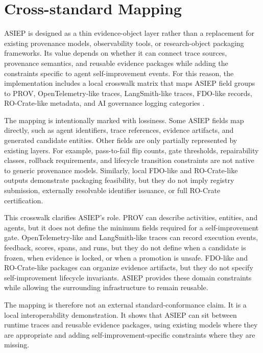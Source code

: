 \section{Cross-standard Mapping}

ASIEP is designed as a thin evidence-object layer rather than a replacement for existing provenance models, observability tools, or research-object packaging frameworks. Its value depends on whether it can connect trace sources, provenance semantics, and reusable evidence packages while adding the constraints specific to agent self-improvement events. For this reason, the implementation includes a local crosswalk matrix that maps ASIEP field groups to PROV, OpenTelemetry-like traces, LangSmith-like traces, FDO-like records, RO-Crate-like metadata, and AI governance logging categories \cite{w3c_prov_dm,otel_genai_semconv,langsmith_observability_concepts,fdo_architecture_spec,workflow_run_rocrate}.



The mapping is intentionally marked with lossiness. Some ASIEP fields map directly, such as agent identifiers, trace references, evidence artifacts, and generated candidate entities. Other fields are only partially represented by existing layers. For example, pass-to-fail flip counts, gate thresholds, repairability classes, rollback requirements, and lifecycle transition constraints are not native to generic provenance models. Similarly, local FDO-like and RO-Crate-like outputs demonstrate packaging feasibility, but they do not imply registry submission, externally resolvable identifier issuance, or full RO-Crate certification.

This crosswalk clarifies ASIEP's role. PROV can describe activities, entities, and agents, but it does not define the minimum fields required for a self-improvement gate. OpenTelemetry-like and LangSmith-like traces can record execution events, feedback, scores, spans, and runs, but they do not define when a candidate is frozen, when evidence is locked, or when a promotion is unsafe. FDO-like and RO-Crate-like packages can organize evidence artifacts, but they do not specify self-improvement lifecycle invariants. ASIEP provides these domain constraints while allowing the surrounding infrastructure to remain reusable.

The mapping is therefore not an external standard-conformance claim. It is a local interoperability demonstration. It shows that ASIEP can sit between runtime traces and reusable evidence packages, using existing models where they are appropriate and adding self-improvement-specific constraints where they are missing.

